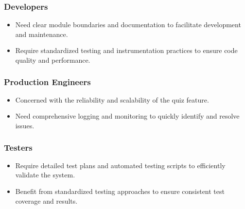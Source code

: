 \subsubsection{Developers}

\begin{itemize}
  \item Need clear module boundaries and documentation to facilitate development and maintenance.
  \item Require standardized testing and instrumentation practices to ensure code quality and performance.
\end{itemize}

\subsubsection{Production Engineers}

\begin{itemize}
  \item Concerned with the reliability and scalability of the quiz feature.
  \item Need comprehensive logging and monitoring to quickly identify and resolve issues.
\end{itemize}

\subsubsection{Testers}

\begin{itemize}
  \item Require detailed test plans and automated testing scripts to efficiently validate the system.
  \item Benefit from standardized testing approaches to ensure consistent test coverage and results.
\end{itemize}


